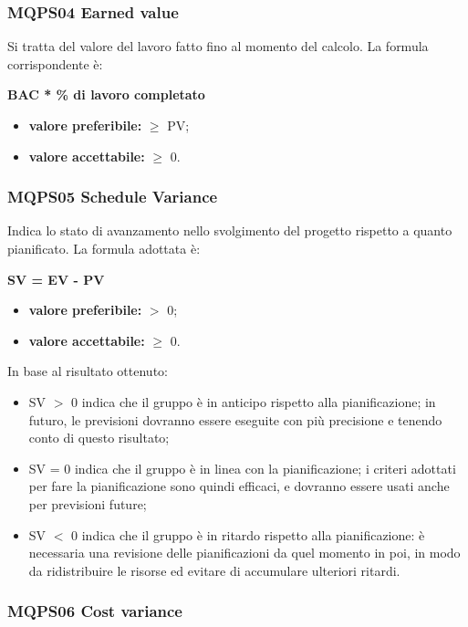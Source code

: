 \subsubsection{MQPS04 Earned value}\label{QualitàDelProcessoProcessoDiPianificazioneMetricheMQPS04}
Si tratta del valore del lavoro fatto fino al momento del calcolo.
La formula corrispondente è:
\begin{center}
	\textbf{BAC * \% di lavoro completato}
\end{center}
\begin{itemize}
	\item \textbf{valore preferibile:} $\geq$ PV;
	\item \textbf{valore accettabile:} $\geq$ 0.
\end{itemize}

\subsubsection{MQPS05 Schedule Variance}\label{QualitàDelProcessoProcessoDiPianificazioneMetricheMQPS05}
Indica lo stato di avanzamento nello svolgimento del progetto rispetto a quanto pianificato.
La formula adottata è:
\begin{center}
	\textbf{SV = EV - PV}
\end{center}
\begin{itemize}
	\item \textbf{valore preferibile:} $>$ 0;
	\item \textbf{valore accettabile:} $\geq$ 0.
\end{itemize}
In base al risultato ottenuto:
\begin{itemize}
	\item SV $>$ 0  indica che il gruppo è in anticipo rispetto alla pianificazione; in futuro,
	le previsioni dovranno essere eseguite con più precisione e tenendo conto di questo
	risultato;
	\item SV = 0  indica che il gruppo è in linea con la pianificazione; i criteri adottati per
	fare la pianificazione sono quindi efficaci, e dovranno essere usati anche per previsioni
	future;
	\item SV $<$ 0 indica che il gruppo è in ritardo rispetto alla pianificazione: è necessaria
	una revisione delle pianificazioni da quel momento in poi, in modo da ridistribuire le
	risorse ed evitare di accumulare ulteriori ritardi.
\end{itemize}

\subsubsection{MQPS06 Cost variance}\label{QualitàDelProcessoProcessoDiPianificazioneMetricheMQPS06}

